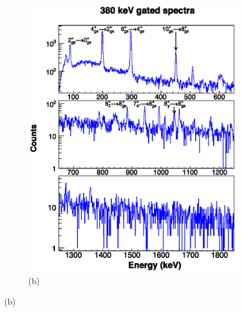     \begin{figure}
    \ContinuedFloat
    \begin{subfigure}{\textwidth}
    \includegraphics[scale=1.3]{156GdTablesAndFigs/380_gamma.eps}
    \caption*{(b)}
    \label{fig:156_8to6spec}
    \end{subfigure}
\end{figure}